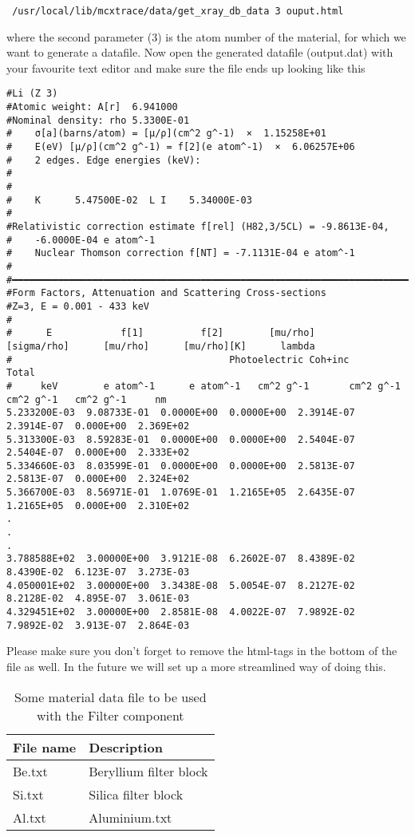 \begin {verbatim}
 /usr/local/lib/mcxtrace/data/get_xray_db_data 3 ouput.html
\end{verbatim}
where the second parameter (3) is the atom number of the material, for which we want to generate a datafile.
Now open the generated datafile (output.dat) with your favourite text editor and make sure the file ends up looking like this
\begin{verbatim}
#Li (Z 3)
#Atomic weight: A[r]  6.941000
#Nominal density: rho 5.3300E-01
#    σ[a](barns/atom) = [μ/ρ](cm^2 g^-1)  ×  1.15258E+01
#    E(eV) [μ/ρ](cm^2 g^-1) = f[2](e atom^-1)  ×  6.06257E+06
#    2 edges. Edge energies (keV):
#
#
#    K      5.47500E-02  L I    5.34000E-03
#
#Relativistic correction estimate f[rel] (H82,3/5CL) = -9.8613E-04,
#    -6.0000E-04 e atom^-1
#    Nuclear Thomson correction f[NT] = -7.1131E-04 e atom^-1
#
#━━━━━━━━━━━━━━━━━━━━━━━━━━━━━━━━━━━━━━━━━━━━━━━━━━━━━━━━━━━━━━━━━━━━━━━━━━━━━━━
#Form Factors, Attenuation and Scattering Cross-sections
#Z=3, E = 0.001 - 433 keV
#
#      E            f[1]          f[2]        [mu/rho]      [sigma/rho]      [mu/rho]      [mu/rho][K]      lambda
#                                      Photoelectric Coh+inc      Total
#     keV        e atom^-1      e atom^-1   cm^2 g^-1       cm^2 g^-1      cm^2 g^-1   cm^2 g^-1     nm
5.233200E-03  9.08733E-01  0.0000E+00  0.0000E+00  2.3914E-07  2.3914E-07  0.000E+00  2.369E+02
5.313300E-03  8.59283E-01  0.0000E+00  0.0000E+00  2.5404E-07  2.5404E-07  0.000E+00  2.333E+02
5.334660E-03  8.03599E-01  0.0000E+00  0.0000E+00  2.5813E-07  2.5813E-07  0.000E+00  2.324E+02
5.366700E-03  8.56971E-01  1.0769E-01  1.2165E+05  2.6435E-07  1.2165E+05  0.000E+00  2.310E+02
.
.
.
3.788588E+02  3.00000E+00  3.9121E-08  6.2602E-07  8.4389E-02  8.4390E-02  6.123E-07  3.273E-03
4.050001E+02  3.00000E+00  3.3438E-08  5.0054E-07  8.2127E-02  8.2128E-02  4.895E-07  3.061E-03
4.329451E+02  3.00000E+00  2.8581E-08  4.0022E-07  7.9892E-02  7.9892E-02  3.913E-07  2.864E-03
\end{verbatim}
Please make sure you don't forget to remove the html-tags in the bottom of the file as well. In the future we will set
up a more streamlined way of doing this.

\begin{table}
  \begin{center}
  {\let\my=\\
    \begin{tabular}{|l|p{}|}
    \hline
    File name & Description \\
    \hline
    Be.txt & Beryllium filter block\\
    Si.txt & Silica filter block\\
    Al.txt & Aluminium.txt\\
    \hline
    \end{tabular}
    \caption{Some material data file to be used with the Filter component}
    \label{t:source-params}
  }
  \end{center}
\end{table}

